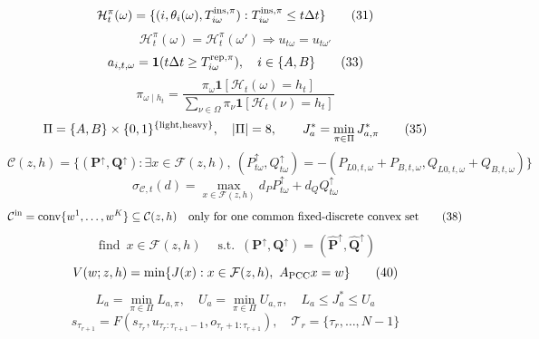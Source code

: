 \documentclass[11pt]{article}
\begin{document}
\begin{equation}
\mathcal H^\pi_t(\omega)=\{(i,\theta_i(\omega),T^{\rm ins,\pi}_{i\omega}):T^{\rm ins,\pi}_{i\omega}\le t\Delta t\}
\tag{31}
\end{equation}
\begin{equation}
\mathcal H^\pi_t(\omega)=\mathcal H^\pi_t(\omega')\Rightarrow u_{t\omega}=u_{t\omega'}
\tag{32}
\end{equation}
\begin{equation}
a_{i,t,\omega}=\mathbf1(t\Delta t\ge T^{\rm rep,\pi}_{i\omega}),\quad i\in\{A,B\}
\tag{33}
\end{equation}
\begin{equation}
\pi_{\omega\mid h_t}=\frac{\pi_\omega\mathbf1[\mathcal H_t(\omega)=h_t]}{\sum_{\nu\in\Omega}\pi_\nu\mathbf1[\mathcal H_t(\nu)=h_t]}
\tag{34}
\end{equation}
\begin{equation}
\Pi=\{A,B\}\times\{0,1\}^{\{\rm light,heavy\}},\quad|\Pi|=8,\qquad J_a^*=\min_{\pi\in\Pi}J^*_{a,\pi}
\tag{35}
\end{equation}
\begin{equation}
\mathcal C(z,h)=\{(\mathbf P^\uparrow,\mathbf Q^\uparrow):\exists x\in\mathcal F(z,h),\ (P^\uparrow_{t\omega},Q^\uparrow_{t\omega})=-(P_{L0,t,\omega}+P_{B,t,\omega},Q_{L0,t,\omega}+Q_{B,t,\omega})\}
\tag{36}
\end{equation}
\begin{equation}
\sigma_{\mathcal C,t}(d)=\max_{x\in\mathcal F(z,h)}d_P P^\uparrow_{t\omega}+d_Q Q^\uparrow_{t\omega}
\tag{37}
\end{equation}
\begin{equation}
\mathcal C^{\rm in}=\operatorname{conv}\{w^1,\ldots,w^K\}\subseteq\mathcal C(z,h)\quad\text{only for one common fixed-discrete convex set}
\tag{38}
\end{equation}
\begin{equation}
\operatorname{find}\ x\in\mathcal F(z,h)\quad\operatorname{s.t.}\ (\mathbf P^\uparrow,\mathbf Q^\uparrow)=(\widehat{\mathbf P}^\uparrow,\widehat{\mathbf Q}^\uparrow)
\tag{39}
\end{equation}
\begin{equation}
V(w;z,h)=\min\{J(x):x\in\mathcal F(z,h),\ A_{\rm PCC}x=w\}
\tag{40}
\end{equation}
\begin{equation}
L_a=\min_{\pi\in\Pi}L_{a,\pi},\quad U_a=\min_{\pi\in\Pi}U_{a,\pi},\quad L_a\le J_a^*\le U_a
\tag{41}
\end{equation}
\begin{equation}
s_{\tau_{r+1}}=F(s_{\tau_r},u_{\tau_r:\tau_{r+1}-1},o_{\tau_r+1:\tau_{r+1}}),\quad\mathcal T_r=\{\tau_r,\ldots,N-1\}
\tag{42}
\end{equation}
\end{document}
